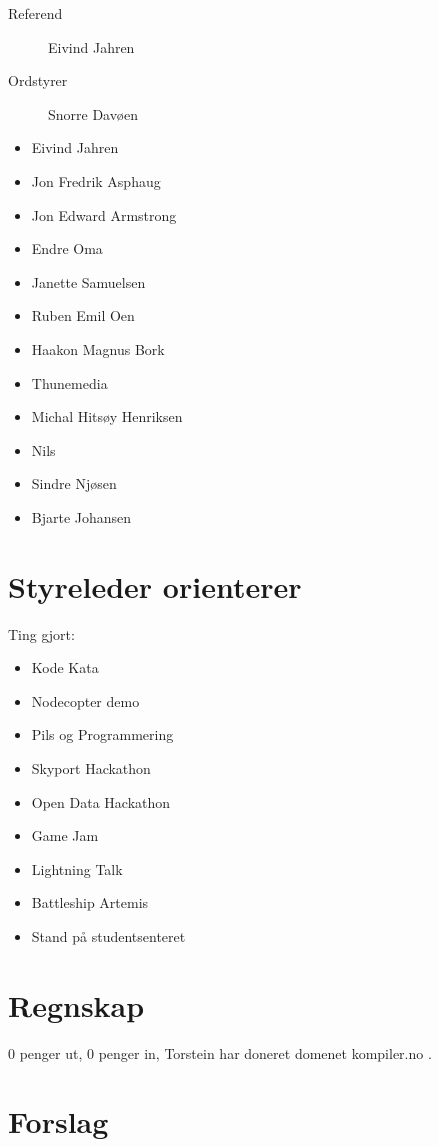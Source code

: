 \documentclass{article}
\begin{document}
\begin{description}
  \item[Referend] Eivind Jahren
  \item[Ordstyrer] Snorre Davøen
\end{description}

\begin{itemize}
  \item Eivind Jahren
  \item Jon Fredrik Asphaug
  \item Jon Edward Armstrong
  \item Endre Oma
  \item Janette Samuelsen
  \item  Ruben Emil Oen
  \item Haakon Magnus Bork
  \item Thunemedia
  \item Michal Hitsøy Henriksen
  \item Nils
  \item Sindre Njøsen
  \item Bjarte Johansen
\end{itemize}


\section*{Styreleder orienterer}

Ting gjort:
    \begin{itemize}
      \item Kode Kata
      \item Nodecopter demo
      \item Pils og Programmering
      \item Skyport Hackathon
      \item Open Data Hackathon
      \item Game Jam
      \item Lightning Talk
      \item Battleship Artemis
      \item Stand på studentsenteret
    \end{itemize}

\section*{Regnskap}

0 penger ut, 0 penger in, Torstein har doneret domenet kompiler.no .

\section*{Forslag}
\end{document}
